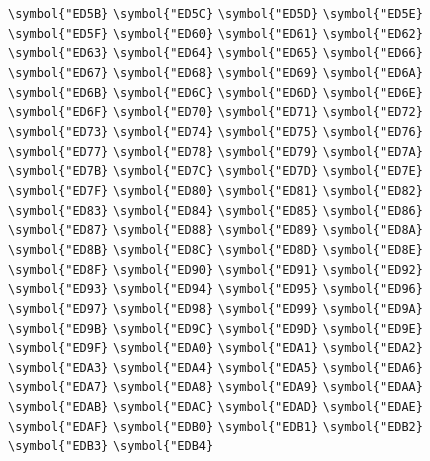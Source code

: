\documentclass{ctexbook}
\begin{document}
{\verb|\symbol{"ED5B}|  \verb|\symbol{"ED5C}|  \verb|\symbol{"ED5D}|  \verb|\symbol{"ED5E}|  \verb|\symbol{"ED5F}|  \verb|\symbol{"ED60}|  \verb|\symbol{"ED61}|  \verb|\symbol{"ED62}|  \verb|\symbol{"ED63}|  \verb|\symbol{"ED64}|  \verb|\symbol{"ED65}|  \verb|\symbol{"ED66}|  \verb|\symbol{"ED67}|  \verb|\symbol{"ED68}|  \verb|\symbol{"ED69}|  \verb|\symbol{"ED6A}|  \verb|\symbol{"ED6B}|  \verb|\symbol{"ED6C}|  \verb|\symbol{"ED6D}|  \verb|\symbol{"ED6E}|  \verb|\symbol{"ED6F}|  \verb|\symbol{"ED70}|  \verb|\symbol{"ED71}|  \verb|\symbol{"ED72}|  \verb|\symbol{"ED73}|  \verb|\symbol{"ED74}|  \verb|\symbol{"ED75}|  \verb|\symbol{"ED76}|  \verb|\symbol{"ED77}|  \verb|\symbol{"ED78}|  \verb|\symbol{"ED79}|  \verb|\symbol{"ED7A}|  \verb|\symbol{"ED7B}|  \verb|\symbol{"ED7C}|  \verb|\symbol{"ED7D}|  \verb|\symbol{"ED7E}|  \verb|\symbol{"ED7F}|  \verb|\symbol{"ED80}|  \verb|\symbol{"ED81}|  \verb|\symbol{"ED82}|  \verb|\symbol{"ED83}|  \verb|\symbol{"ED84}|  \verb|\symbol{"ED85}|  \verb|\symbol{"ED86}|  \verb|\symbol{"ED87}|  \verb|\symbol{"ED88}|  \verb|\symbol{"ED89}|  \verb|\symbol{"ED8A}|  \verb|\symbol{"ED8B}|  \verb|\symbol{"ED8C}|  \verb|\symbol{"ED8D}|  \verb|\symbol{"ED8E}|  \verb|\symbol{"ED8F}|  \verb|\symbol{"ED90}|  \verb|\symbol{"ED91}|  \verb|\symbol{"ED92}|  \verb|\symbol{"ED93}|  \verb|\symbol{"ED94}|  \verb|\symbol{"ED95}|  \verb|\symbol{"ED96}|  \verb|\symbol{"ED97}|  \verb|\symbol{"ED98}|  \verb|\symbol{"ED99}|  \verb|\symbol{"ED9A}|  \verb|\symbol{"ED9B}|  \verb|\symbol{"ED9C}|  \verb|\symbol{"ED9D}|  \verb|\symbol{"ED9E}|  \verb|\symbol{"ED9F}|  \verb|\symbol{"EDA0}|  \verb|\symbol{"EDA1}|  \verb|\symbol{"EDA2}|  \verb|\symbol{"EDA3}|  \verb|\symbol{"EDA4}|  \verb|\symbol{"EDA5}|  \verb|\symbol{"EDA6}|  \verb|\symbol{"EDA7}|  \verb|\symbol{"EDA8}|  \verb|\symbol{"EDA9}|  \verb|\symbol{"EDAA}|  \verb|\symbol{"EDAB}|  \verb|\symbol{"EDAC}|  \verb|\symbol{"EDAD}|  \verb|\symbol{"EDAE}|  \verb|\symbol{"EDAF}|  \verb|\symbol{"EDB0}|  \verb|\symbol{"EDB1}|  \verb|\symbol{"EDB2}|  \verb|\symbol{"EDB3}|  \verb|\symbol{"EDB4}|  }
\end{document}
